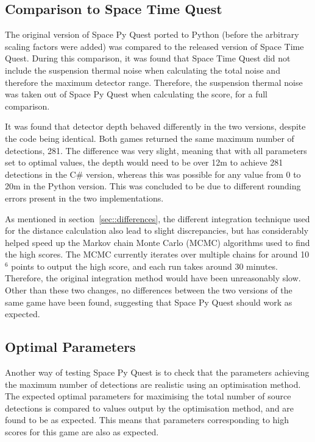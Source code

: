 \documentclass{article}
\begin{document}
\subsection{Comparison to Space Time Quest}

The original version of Space Py Quest ported to Python (before the
arbitrary scaling factors were added) was compared to the released
version of Space Time Quest. During this comparison, it was found that
Space Time Quest did not include the suspension thermal noise when
calculating the total noise and therefore the maximum detector
range. Therefore, the suspension thermal noise was taken out of
Space Py Quest when calculating the score, for a full comparison.

It was found that detector depth behaved differently in the two
versions, despite the code being identical. Both games returned the
same maximum number of detections, 281. The difference was very
slight, meaning that with all parameters set to optimal values, the
depth would need to be over 12m to achieve 281 detections in the C\#
version, whereas this was possible for any value from 0 to 20m in the
Python version. This was concluded to be due to different rounding
errors present in the two implementations. 

As mentioned in section~\ref{sec::differences}, the different
integration technique used for the distance calculation also lead to
slight discrepancies, but has considerably helped speed up the Markov
chain Monte Carlo (MCMC) algorithms used to find the high scores. The
MCMC currently iterates over multiple chains for around 10$^6$ points
to output the high score, and each run takes around 30
minutes. Therefore, the original integration method would have been
unreasonably slow. Other than these two changes, no differences
between the two versions of the same game have been found, suggesting
that Space Py Quest should work as expected.

\subsection{Optimal Parameters}
Another way of testing Space Py Quest is to check that the parameters
achieving the maximum number of detections are realistic using an
optimisation method. The expected optimal parameters for maximising
the total number of source detections is compared to values output by
the optimisation method, and are found to be as expected. This means
that parameters corresponding to high scores for this game are also as
expected. 
\end{document}
